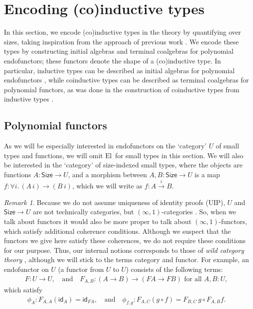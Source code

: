 \documentclass[10pt,a4paper]{article}
\theoremstyle{definition}
\theoremstyle{remark}
\renewcommand{\.}{.\,} %
\renewcommand{\:}{:} %
\newcommand{\El}{\mathrm{El}\,}
\newcommand{\Size}{\mathsf{Size}}
\newcommand{\F}{F}
\newcommand{\id}{\mathsf{id}}
\newcommand{\0}{\mathbf{0}}
\newcommand{\1}{\mathbf{1}}
\newcommand\<\langle
\renewcommand\>\rangle
\newcommand{\U}{U}
\theoremstyle{remark}
\newtheorem*{remark*}{Remark}
\begin{document}
    \section{Encoding (co)inductive types}
    \label{sec:encoding}
    

In this section, we encode (co)inductive types in the theory by quantifying over sizes, taking inspiration from the approach of previous work \cite{parametric-quantifier, licentiate}.
We encode these types by constructing initial algebras and terminal coalgebras for polynomial endofunctors; these functors denote the shape of a (co)inductive type.
In particular, inductive types can be described as initial algebras for polynomial endofunctors \cite{containers, homotopy-init}, while coinductive types can be described as terminal coalgebras for polynomial functors, as was done in the construction of coinductive types from inductive types \cite{ahrens_et_al:LIPIcs.TLCA.2015.17}.

\subsection{Polynomial functors}
As we will be especially interested in endofunctors on the `category' \(U\) of small types and functions, we will omit $\El$ for small types in this section. 
We will also be interested in the `category' of size-indexed small types, where the objects are functions $A : \Size \to \U$, and a morphism between $A, B : \Size \to \U$ is a map $f : \forall i \. (A \, i) \to (B \ i)$, which we will write as $f : A \overset{i}{\to} B$. 

\begin{remark*}
Because we do not assume uniqueness of identity proofs (UIP), $U$ and \(\Size\to U\) are not technically categories, but \((\infty,1)\)-categories \cite{van2011types}.
So, when we talk about functors it would also be more proper to talk about \((\infty,1)\)-functors, which satisfy additional coherence conditions.
Although we suspect that the functors we give here satisfy these coherences, we do not require these conditions for our purpose.
Thus, our internal notions corresponds to those of \emph{wild category theory} \cite{guarded-cubical}, although we will stick to the terms category and functor.
For example, an endofunctor on \(U\) (a functor from \(U\) to \(U\)) consists of the following terms:\begin{align*}
    \F : \U \to \U, \quad\text{and}\quad \F_{A,B} : (A \to B) \to (\F A \to \F B)\text{ for all }A,B:\U,
\end{align*} which satisfy \begin{align*} 
    \phi_A : \F_{A, A}(\id_A) = \id_{FA},  \quad \text{and} \quad
    \phi_{f, g} : \F_{A, C}(g \circ f) = \F_{B, C} \, g \circ \F_{A, B} f.
\end{align*} 
\end{remark*}
\end{document}
